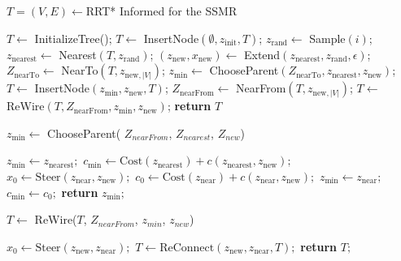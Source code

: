 \documentclass[conference]{IEEEtran}
\begin{document}
\begin{algorithm}[t!]
\caption{ $T =(V,E) \leftarrow$RRT* Informed for the SSMR}
\label{Alg::rrt-unycle}
\begin{algorithmic}[1]
\State $T  \leftarrow$ InitializeTree();
\State $T \leftarrow$ InsertNode$(\emptyset, z_{\text{init}}, T)$;
    \State $z_{\text{rand}} \leftarrow$ Sample$(i)$;
    \State $z_{\text{nearest}} \leftarrow$ Nearest$(T, z_{\text{rand}})$;
    \State $(z_{\text{new}}, x_{\text{new}}) \leftarrow$ Extend$(z_{\text{nearest}}, z_{\text{rand}}, \epsilon)$;
        \State $Z_{\text{nearTo}} \leftarrow$ NearTo$(T, z_{\text{new}, |V|})$;
        \State $z_{\text{min}} \leftarrow$ ChooseParent$(Z_{\text{nearTo}}, z_{\text{nearest}}, z_{\text{new}})$;
        \State $T \leftarrow$ InsertNode$(z_{\text{min}}, z_{\text{new}}, T)$;
        \State $Z_{\text{nearFrom}} \leftarrow$ NearFrom$(T, z_{\text{new}, |V|})$;
        \State $T \leftarrow$ ReWire$(T, Z_{\text{nearFrom}}, z_{\text{min}}, z_{\text{new}})$;
    \EndIf
\EndFor
\State \textbf{return} $T$
\end{algorithmic}
\end{algorithm}

\begin{algorithm}[t!]

\caption{$z_{\text{min}} \leftarrow$ ChooseParent( $Z_{nearFrom}$,  $Z_{nearest}$,  $Z_{new}$)}
\label{Alg::ChooseParent}
\begin{algorithmic}[1]
\State $z_{\text{min}} \leftarrow z_{\text{nearest}};$
\State $c_{\text{min}} \leftarrow \text{Cost}(z_{\text{nearest}}) + c(z_{\text{nearest}}, z_{\text{new}});$
    \State $x_0 \leftarrow \text{Steer}(z_{\text{near}}, z_{\text{new}});$
        \State $c_0 \leftarrow \text{Cost}(z_{\text{near}}) + c(z_{\text{near}}, z_{\text{new}});$
            \State $z_{\text{min}} \leftarrow z_{\text{near}};$
            \State $c_{\text{min}} \leftarrow c_0;$
        \EndIf
    \EndIf
\EndFor
\State \textbf{return} $z_{\text{min}};$
\end{algorithmic}
\end{algorithm}

\begin{algorithm}[t!]
\caption{$T \leftarrow$ ReWire($T$, $Z_{nearFrom}$, $z_{min}$, $z_{new}$)}
\label{Alg::ReWire}
\begin{algorithmic}[1]
    \State $x_0 \leftarrow \text{Steer}(z_{\text{new}}, z_{\text{near}});$
        \State $T \leftarrow \text{ReConnect}(z_{\text{new}}, z_{\text{near}}, T);$
    \EndIf
\EndFor
\State \textbf{return} $T;$
\end{algorithmic}
\end{algorithm}
\end{document}
